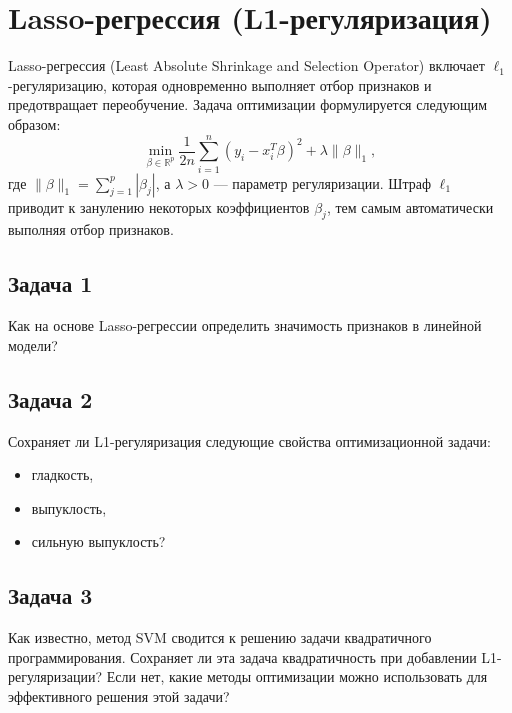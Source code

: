 \section*{Lasso-регрессия (L1-регуляризация)}

Lasso-регрессия (Least Absolute Shrinkage and Selection Operator) включает $\ell_1$-регуляризацию, которая одновременно выполняет отбор признаков и предотвращает переобучение. Задача оптимизации формулируется следующим образом:
\[
\min_{\beta \in \mathbb{R}^p} \frac{1}{2n} \sum_{i=1}^n (y_i - x_i^T \beta)^2 + \lambda \|\beta\|_1,
\]
где $\|\beta\|_1 = \sum_{j=1}^p |\beta_j|$, а $\lambda > 0$ — параметр регуляризации. Штраф $\ell_1$ приводит к занулению некоторых коэффициентов $\beta_j$, тем самым автоматически выполняя отбор признаков.

\subsection*{Задача 1}
Как на основе Lasso-регрессии определить значимость признаков в линейной модели? 

\subsection*{Задача 2}
Сохраняет ли L1-регуляризация следующие свойства оптимизационной задачи:
\begin{itemize}
    \item гладкость,
    \item выпуклость,
    \item сильную выпуклость?
\end{itemize}

\subsection*{Задача 3}
Как известно, метод SVM сводится к решению задачи квадратичного программирования. Сохраняет ли эта задача квадратичность при добавлении L1-регуляризации? Если нет, какие методы оптимизации можно использовать для эффективного решения этой задачи?
